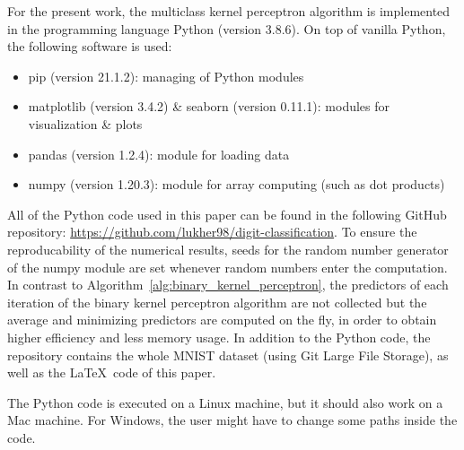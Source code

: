 For the present work, the multiclass kernel perceptron algorithm is implemented in the programming language Python (version 3.8.6).
On top of vanilla Python, the following software is used:
\begin{itemize}
	\item pip (version 21.1.2): managing of Python modules 
	\item matplotlib (version 3.4.2) \& seaborn (version 0.11.1): modules for visualization \& plots
	\item pandas (version 1.2.4): module for loading data
	\item numpy (version 1.20.3): module for array computing (such as dot products)
\end{itemize}
All of the Python code used in this paper can be found in the following GitHub repository: \url{https://github.com/lukher98/digit-classification}. To ensure the reproducability of the numerical results, seeds for the random number generator of the numpy module are set whenever random numbers enter the computation. In contrast to Algorithm~\ref{alg:binary_kernel_perceptron}, the predictors of each iteration of the binary kernel perceptron algorithm are not collected but the average and minimizing predictors are computed on the fly, in order to obtain higher efficiency and less memory usage.
In addition to the Python code, the repository contains the whole MNIST dataset (using Git Large File Storage), as well as the \LaTeX\ code of this paper.

The Python code is executed on a Linux machine, but it should also work on a Mac machine. For Windows, the user might have to change some paths inside the code.
